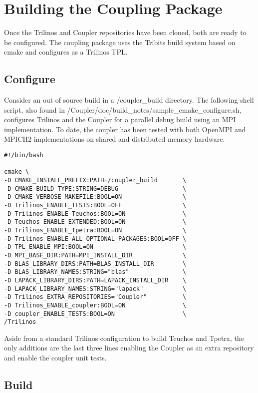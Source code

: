 \documentclass[letterpaper]{article}
\begin{document}
\section{Building the Coupling Package}
Once the Trilinos and Coupler repositories have been cloned, both are
ready to be configured. The coupling package uses the Tribits build
system based on cmake and configures as a Trilinos TPL.

\subsection{Configure}
Consider an out of source build in a /coupler\_build directory. The
following shell script, also found in
/Coupler/doc/build\_notes/sample\_cmake\_configure.sh, configures
Trilinos and the Coupler for a parallel debug build using an MPI
implementation. To date, the coupler has been tested with both OpenMPI
and MPICH2 implementations on shared and distributed memory hardware.

\begin{verbatim}
#!/bin/bash

cmake \
-D CMAKE_INSTALL_PREFIX:PATH=/coupler_build       \
-D CMAKE_BUILD_TYPE:STRING=DEBUG                  \
-D CMAKE_VERBOSE_MAKEFILE:BOOL=ON                 \
-D Trilinos_ENABLE_TESTS:BOOL=OFF                 \
-D Trilinos_ENABLE_Teuchos:BOOL=ON                \
-D Teuchos_ENABLE_EXTENDED:BOOL=ON                \
-D Trilinos_ENABLE_Tpetra:BOOL=ON                 \
-D Trilinos_ENABLE_ALL_OPTIONAL_PACKAGES:BOOL=OFF \
-D TPL_ENABLE_MPI:BOOL=ON                         \
-D MPI_BASE_DIR:PATH=MPI_INSTALL_DIR              \
-D BLAS_LIBRARY_DIRS:PATH=BLAS_INSTALL_DIR        \
-D BLAS_LIBRARY_NAMES:STRING="blas"               \
-D LAPACK_LIBRARY_DIRS:PATH=LAPACK_INSTALL_DIR    \
-D LAPACK_LIBRARY_NAMES:STRING="lapack"           \
-D Trilinos_EXTRA_REPOSITORIES="Coupler"          \
-D Trilinos_ENABLE_coupler:BOOL=ON                \
-D coupler_ENABLE_TESTS:BOOL=ON                   \
/Trilinos
\end{verbatim}

Aside from a standard Trilinos configuration to build Teuchos and
Tpetra, the only additions are the last three lines enabling the
Coupler as an extra repository and enable the coupler unit tests.

\subsection{Build}
\end{document}
